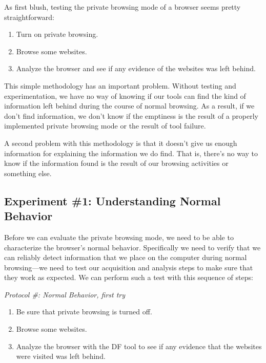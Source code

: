 As first blush, testing the private browsing mode of a browser seems
pretty straightforward:

\begin{enumerate}
\item Turn on private browsing.
\item Browse some websites.
\item Analyze the browser and see if any evidence of the websites was
  left behind. 
\end{enumerate}

This simple methodology has an important problem. Without testing and
experimentation, we have no way of knowing if our tools can find the
kind of information left behind during the course of normal
browsing. As a result, if we don't find information, we don't know if
the emptiness is the result of a properly implemented private browsing
mode or the result of tool failure.

A second problem with this methodology is that it doesn't give us
enough information for explaining the information we do find. That is,
there's no way to know if the information found is the result of our
browsing activities or something else.

\subsection{Experiment \#1: Understanding Normal Behavior}

Before we can evaluate the private browsing mode, we need to be able
to characterize the browser's normal behavior. Specifically we need to
verify that we can reliably detect information that we place on the computer
during normal browsing---we need to test our acquisition and analysis
steps to make sure that they work as expected. We can perform such a test with this sequence of steps:

\setcounter{protocol}{0}
\newcommand{\protocol}[1]{\noindent\textit{Protocol \#: #1}}

\protocol{Normal Behavior, first try}
\begin{enumerate}
\item Be sure that private browsing is turned off.
\item Browse some websites.
\item Analyze the browser with the DF tool to see if any evidence that the websites
  were visited was left behind. 
\end{enumerate}

